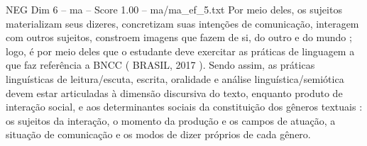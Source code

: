 \begin{textsample}{NEG Dim 6 – ma – Score 1.00 – ma/ma\_ef\_5.txt}
Por meio deles, os sujeitos materializam seus dizeres, concretizam suas intenções de comunicação, interagem com outros sujeitos, constroem imagens que fazem de si, do outro e do mundo ; logo, é por meio deles que o estudante deve exercitar as práticas de linguagem a que faz referência a BNCC ( BRASIL, 2017 ).
Sendo assim, as práticas linguísticas de leitura/escuta, escrita, oralidade e análise linguística/semiótica devem estar articuladas à dimensão discursiva do texto, enquanto produto de interação social, e aos determinantes sociais da constituição dos gêneros textuais : os sujeitos da interação, o momento da produção e os campos de atuação, a situação de comunicação e os modos de dizer próprios de cada gênero.

\end{textsample}
